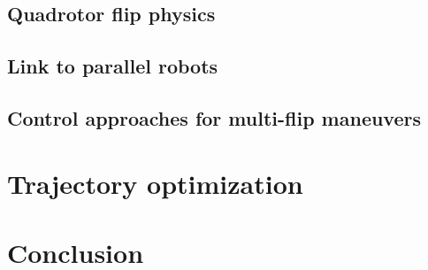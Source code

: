 \documentclass{thesisreport}
\begin{document}
 \section{Quadrotor flip physics}
 
 \section{Link to parallel robots}
 
 \section{Control approaches for multi-flip maneuvers}
  
 \chapter{Trajectory optimization} 
 
 \chapter*{Conclusion}
 
 
 
 


 \nocite{*}
 
 


 
\end{document}
